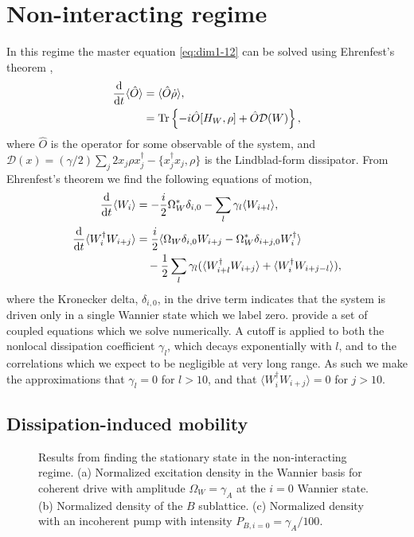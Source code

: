 \section{Non-interacting regime}
In this regime the master equation \cref{eq:dim1-12} can be solved using Ehrenfest's theorem \cite{Ehrenfest1927,BP_Ehrenfest},
\begin{align}
	\frac{\mathrm{d}}{\mathrm{d}t} \langle \hat{O} \rangle &= \langle \hat{O} \dot{\rho} \rangle, \notag \\
	&= \mathrm{Tr}\left\{ -i\hat{O}[H_{W}, \rho] + \hat{O}\mathcal{D}(W) \right\},
	\label{eq:dim2-1}
\end{align}
where \(\hat{O}\) is the operator for some observable of the system, and \(\mathcal{D}(x)=(\gamma/2)\sum_{j}2x_{j}\rho x_{j}^{\dagger} - \{x_{j}^{\dagger}x_{j}, \rho\}\) is the Lindblad-form dissipator. From Ehrenfest's theorem we find the following equations of motion,
\begin{align}
	\frac{\mathrm{d}}{\mathrm{d}t} \langle W_{i} \rangle &= -\frac{i}{2}\Omega_{W}^{*}\delta_{i,0} - \sum_{l} \gamma_{l}\langle W_{i+l} \rangle, \label{eq:dim2-2} \\
	\frac{\mathrm{d}}{\mathrm{d}t} \langle W_{i}^{\dagger}W_{i+j} \rangle &= \frac{i}{2} \langle \Omega_{W}\delta_{i,0} W_{i+j} - \Omega_{W}^{*}\delta_{i+j,0}W_{i}^{\dagger} \rangle \notag \\ 
	&\quad - \frac{1}{2}\sum_{l} \gamma_{l} (\langle W_{i+l}^{\dagger}W_{i+j} \rangle + \langle W_{i}^{\dagger}W_{i+j-l}\rangle), \label{eq:dim2-3}
\end{align}
where the Kronecker delta, \(\delta_{i,0}\), in the drive term indicates that the system is driven only in a single Wannier state which we label zero.  provide a set of coupled equations which we solve numerically. A cutoff is applied to both the nonlocal dissipation coefficient \(\gamma_{l}\), which decays exponentially with \(l\), and to the correlations which we expect to be negligible at very long range. As such we make the approximations that \(\gamma_{l} = 0\) for \(l > 10\), and that \(\langle W_{i}^{\dagger}W_{i+j} \rangle = 0\) for \(j > 10\).

\subsection{Dissipation-induced mobility}

\begin{figure}[ht!]
\centering
{}%
%
\caption{Results from finding the stationary state in the non-interacting regime. (a) Normalized excitation density in the Wannier basis for coherent drive with amplitude \(\Omega_{W} = \gamma_{A}\) at the \(i=0\) Wannier state. (b) Normalized density of the \(B\) sublattice. (c) Normalized density with an incoherent pump with intensity \(P_{B,i=0} = \gamma_{A}/100\).}
\label{fig:dim2-1}
\end{figure}

